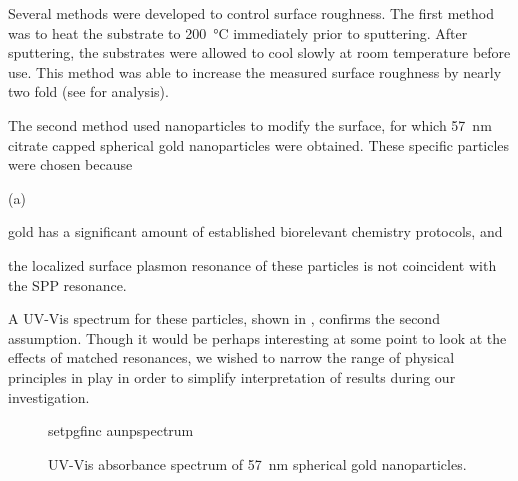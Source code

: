 Several methods were developed to control surface roughness.  The first
method was to heat the substrate to \SI{200}{\celsius} immediately prior to
sputtering.  After sputtering, the substrates were allowed to cool slowly
at room temperature before use.  This method was able to increase the
measured surface roughness by nearly two fold (see
 for analysis).

The second method used nanoparticles to modify the surface, for which
\SI{57}{\nano\meter} citrate capped spherical gold nanoparticles were
obtained.  These specific particles were chosen because
\begin{inparaenum}{(a)}
\item gold has a significant amount of established biorelevant chemistry
				protocols, and
\item the localized surface plasmon resonance of these particles is not
				coincident with the SPP resonance.
\end{inparaenum}
A UV-Vis spectrum for these particles, shown in ,
confirms the second assumption.  Though it would be perhaps interesting at
some point to look at the effects of matched resonances, we wished to
narrow the range of physical principles in play in order to simplify
interpretation of results during our investigation.
\begin{figure}[ht]
 \centering
 {setpgfinc}
 {aunpspectrum}
 \caption{UV-Vis absorbance spectrum of \SI{57}{\nano\meter} spherical gold
 nanoparticles.}
 \label{fig:aunpspectrum}
\end{figure}
